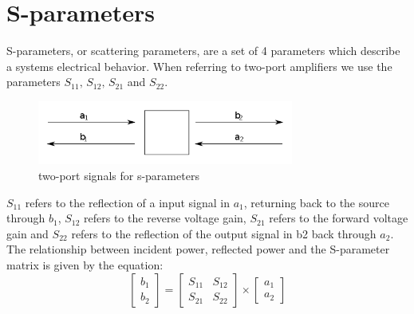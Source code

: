 \section{S-parameters}
S-parameters, or scattering parameters, are a set of 4 parameters which describe a systems electrical behavior. When referring to two-port amplifiers we use the parameters $S_{11},\, S_{12},\, S_{21}$ and $S_{22}$.
\begin{figure}[H]
	  \centering
	  \includegraphics[width=0.75\textwidth]{img/S_parameter_image}
	  \caption{two-port signals for s-parameters}
	  \label{fig:fig_sparam_vis}
\end{figure}
 $S_{11}$ refers to the reflection of a input signal in $a_1$, returning back to the source through $b_1$, $S_{12}$ refers to the reverse voltage gain, $S_{21}$ refers to the forward voltage gain and $S_{22}$ refers to the reflection of the output signal in b2 back through $a_2$.
 The relationship between incident power, reflected power and the S-parameter matrix is given by the equation:
 \begin{equation}
	\begin{bmatrix}
	b_1\\
	b_2
	\end{bmatrix}
	=
	\begin{bmatrix}
	S_{11} & S_{12}\\
	S_{21} & S_{22}
	\end{bmatrix}
	\times
	\begin{bmatrix}
	a_1\\
	a_2
	\end{bmatrix}
 \end{equation}

